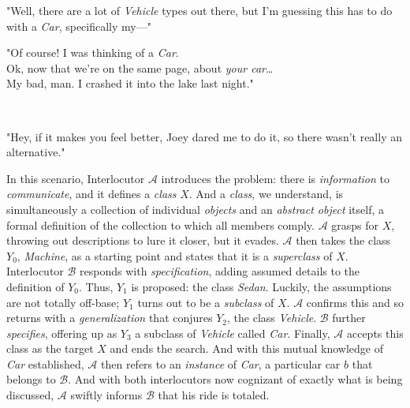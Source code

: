 \begin{addmargin}[2em]{8em}
	"Well, there are a lot of \textit{Vehicle} types out there, but I'm guessing this has to do with a \textit{Car}, specifically my---" \\
\end{addmargin}

\begin{addmargin}[8em]{2em}
	\begin{flushright}
		"Of course! I was thinking of a \textit{Car}. \\[2mm]
		Ok, now that we're on the same page, about \textit{your car}\dots \\
		My bad, man. I crashed it into the lake last night." \\[\baselineskip]
	\end{flushright}
\end{addmargin}

\begin{addmargin}[2em]{8em}
	\mydots \\
\end{addmargin}

\begin{addmargin}[8em]{2em}
	\begin{flushright}
		"Hey, if it makes you feel better, Joey dared me to do it, so there wasn't really an alternative." \\[2\baselineskip]
	\end{flushright}
\end{addmargin}

In this scenario, Interlocutor $\mathcal{A}$ introduces the problem: there is \textit{information} to \textit{communicate}, and it defines a \textit{class} $X$. And a \textit{class}, we understand, is simultaneously a collection of individual \textit{objects} and an \textit{abstract object} itself, a formal definition of the collection to which all members comply. $\mathcal{A}$ grasps for $X$, throwing out descriptions to lure it closer, but it evades. $\mathcal{A}$ then takes the class $Y_0$, \textit{Machine}, as a starting point and states that it is a \textit{superclass} of $X$. \\

Interlocutor $\mathcal{B}$ responds with \textit{specification}, adding assumed details to the definition of $Y_0$. Thus, $Y_1$ is proposed: the class \textit{Sedan}. Luckily, the assumptions are not totally off-base; $Y_1$ turns out to be a \textit{subclass} of $X$. $\mathcal{A}$ confirms this and so returns with a \textit{generalization} that conjures $Y_2$, the class \textit{Vehicle}. $\mathcal{B}$ further \textit{specifies}, offering up as $Y_3$ a subclass of \textit{Vehicle} called \textit{Car}. Finally, $\mathcal{A}$ accepts this class as the target $X$ and ends the search. And with this mutual knowledge of \textit{Car} established, $\mathcal{A}$ then refers to an \textit{instance} of \textit{Car}, a particular car $b$ that belongs to $\mathcal{B}$. And with both interlocutors now cognizant of exactly what is being discussed, $\mathcal{A}$ swiftly informs $\mathcal{B}$ that his ride is totaled.

